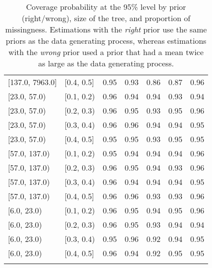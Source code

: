\begin{table}[ht]
\begin{tabular}{llrrrrr}
  {[137.0, 7963.0]} & {[0.4, 0.5]} & 0.95 & 0.93 & 0.86 & 0.87 & 0.96 \\ 
  {[23.0, 57.0)} & {[0.1, 0.2)} & 0.96 & 0.94 & 0.94 & 0.93 & 0.94 \\ 
  {[23.0, 57.0)} & {[0.2, 0.3)} & 0.96 & 0.95 & 0.93 & 0.95 & 0.96 \\ 
  {[23.0, 57.0)} & {[0.3, 0.4)} & 0.96 & 0.96 & 0.94 & 0.94 & 0.95 \\ 
  {[23.0, 57.0)} & {[0.4, 0.5]} & 0.95 & 0.95 & 0.93 & 0.95 & 0.95 \\ 
  {[57.0, 137.0)} & {[0.1, 0.2)} & 0.95 & 0.94 & 0.94 & 0.94 & 0.96 \\ 
  {[57.0, 137.0)} & {[0.2, 0.3)} & 0.96 & 0.95 & 0.94 & 0.93 & 0.96 \\ 
  {[57.0, 137.0)} & {[0.3, 0.4)} & 0.96 & 0.94 & 0.94 & 0.94 & 0.95 \\ 
  {[57.0, 137.0)} & {[0.4, 0.5]} & 0.96 & 0.96 & 0.93 & 0.93 & 0.96 \\ 
  {[6.0, 23.0)} & {[0.1, 0.2)} & 0.96 & 0.95 & 0.94 & 0.95 & 0.96 \\ 
  {[6.0, 23.0)} & {[0.2, 0.3)} & 0.96 & 0.95 & 0.93 & 0.94 & 0.94 \\ 
  {[6.0, 23.0)} & {[0.3, 0.4)} & 0.95 & 0.96 & 0.92 & 0.94 & 0.95 \\ 
  {[6.0, 23.0)} & {[0.4, 0.5]} & 0.96 & 0.94 & 0.92 & 0.95 & 0.95 \\ 
   \bottomrule
\multicolumn{7}{l}{}\\
\end{tabular}
\caption{Coverage probability at the 95\% level by prior (right/wrong), size of the tree, and proportion of missingness.  Estimations with the \emph{right} prior use the same priors as the data generating process, whereas estimations with the \emph{wrong} prior used a prior that had a mean twice as large as the data generating process.} 
\label{tab:coverage95-method-size-missigness}
\end{table}
